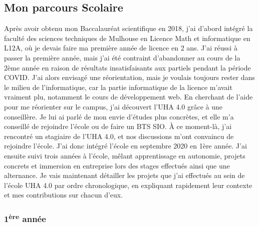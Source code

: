 \documentclass[12pt]{article}
\begin{document}
\subsection{Mon parcours Scolaire}
\justify
\text
Après avoir obtenu mon Baccalauréat scientifique en 2018, j'ai d'abord intégré la faculté des sciences techniques de Mulhouse en Licence Math et informatique en L12A, où je devais faire ma première année de licence en 2 ans.
\justify
\text
J'ai réussi à passer la première année, mais j'ai été contraint d'abandonner au cours de la 2ème année en raison de résultats insatisfaisants aux partiels pendant la période COVID. J'ai alors envisagé une réorientation, mais je voulais toujours rester dans le milieu de l'informatique, car la partie informatique de la licence m'avait vraiment plu, notamment le cours de développement web.
\justify
\text
En cherchant de l'aide pour me réorienter sur le campus, j'ai découvert l'UHA 4.0 grâce à une conseillère. Je lui ai parlé de mon envie d'études plus concrètes, et elle m'a conseillé de rejoindre l'école ou de faire un BTS SIO. À ce moment-là, j'ai rencontré un stagiaire de l'UHA 4.0, et nos discussions m'ont convaincu de rejoindre l'école. J'ai donc intégré l'école en septembre 2020 en 1ère année.
\justify
\text
J'ai ensuite suivi trois années à l'école, mêlant apprentissage en autonomie, projets concrets et immersion en entreprise lors des stages effectués ainsi que une alternance. Je vais maintenant détailler les projets que j'ai effectués au sein de l'école UHA 4.0 par ordre chronologique, en expliquant rapidement leur contexte et mes contributions sur chacun d'eux.

\newpage

\subsubsection{1\textsuperscript{ère} année}
\end{document}

